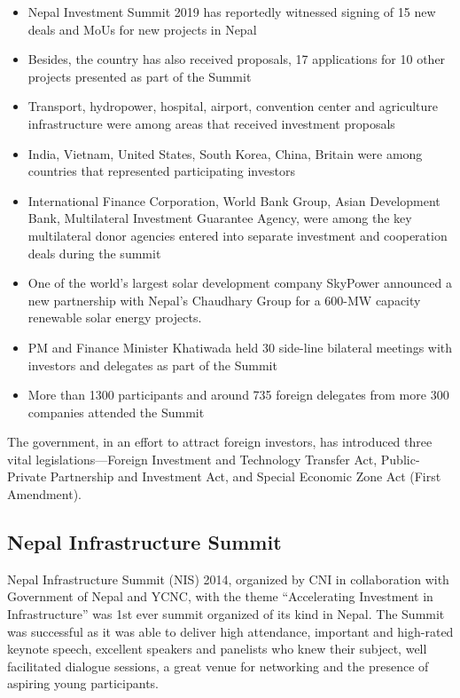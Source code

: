 \documentclass[
]{book}
\providecommand{\tightlist}{%
  \setlength{\itemsep}{0pt}\setlength{\parskip}{0pt}}
\begin{document}
\begin{itemize}
\tightlist
\item
  Nepal Investment Summit 2019 has reportedly witnessed signing of 15 new deals and MoUs for new projects in Nepal
\item
  Besides, the country has also received proposals, 17 applications for 10 other projects presented as part of the Summit
\item
  Transport, hydropower, hospital, airport, convention center and agriculture infrastructure were among areas that received investment proposals
\item
  India, Vietnam, United States, South Korea, China, Britain were among countries that represented participating investors
\item
  International Finance Corporation, World Bank Group, Asian Development Bank, Multilateral Investment Guarantee Agency, were among the key multilateral donor agencies entered into separate investment and cooperation deals during the summit
\item
  One of the world's largest solar development company SkyPower announced a new partnership with Nepal's Chaudhary Group for a 600-MW capacity renewable solar energy projects.
\item
  PM and Finance Minister Khatiwada held 30 side-line bilateral meetings with investors and delegates as part of the Summit
\item
  More than 1300 participants and around 735 foreign delegates from more 300 companies attended the Summit
\end{itemize}

The government, in an effort to attract foreign investors, has introduced three vital legislations---Foreign Investment and Technology Transfer Act, Public-Private Partnership and Investment Act, and Special Economic Zone Act (First Amendment).

\hypertarget{nepal-infrastructure-summit}{%
\subsection{Nepal Infrastructure Summit}\label{nepal-infrastructure-summit}}

Nepal Infrastructure Summit (NIS) 2014, organized by CNI in collaboration with Government of Nepal and YCNC, with the theme ``Accelerating Investment in Infrastructure'' was 1st ever summit organized of its kind in Nepal. The Summit was successful as it was able to deliver high attendance, important and high-rated keynote speech, excellent speakers and panelists who knew their subject, well facilitated dialogue sessions, a great venue for networking and the presence of aspiring young participants.
\end{document}
